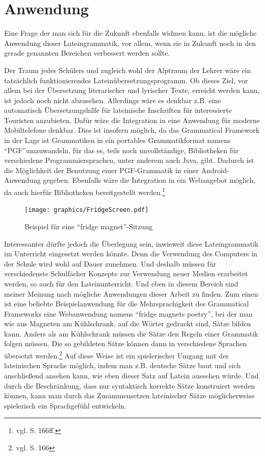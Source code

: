 \section{Anwendung}
Eine Frage der man sich für die Zukunft ebenfalls widmen kann, ist die mögliche Anwendung dieser Lateingrammatik, vor allem, wenn sie in Zukunft noch in den gerade genannten Bereichen verbessert werden sollte. \par
Der Traum jedes Schülers und zugleich wohl der Alptraum der Lehrer wäre ein tatsächlich funktionierendes Lateinübersetzungsprogramm. Ob dieses Ziel, vor allem bei der Übersetzung literarischer und lyrischer Texte, erreicht werden kann, ist jedoch noch nicht abzusehen. Allerdings wäre es denkbar z.B. eine automatisch Übersetzungshilfe für lateinische Inschriften für interessierte Touristen anzubieten. Dafür wäre die Integration in eine Anwendung für moderne Mobiltelefone denkbar. Dies ist insofern möglich, da das Grammatical Framework in der Lage ist Grammatiken in ein portables Grammatikformat namens "`PGF"'umzuwandeln, für das es, teils noch unvollständige, Bibliotheken für verschiedene Programmiersprachen, unter anderem auch Java, gibt. Dadurch ist die Möglichkeit der Benutzung einer PGF-Grammatik in einer Android-Anwendung gegeben. Ebenfalls wäre die Integration in ein Webangebot möglich, da auch hierfür Bibliotheken bereitgestellt werden.\footnote{vgl. \cite{RANTA2011} S. 166ff.} \par
\begin{figure}[h!tp]
\texttt{[image: graphics/FridgeScreen.pdf]}
\caption{Beispiel für eine "`fridge magnet"'-Sitzung}\label{Fridge}
\end{figure}
Interessanter dürfte jedoch die Überlegung sein, inwieweit diese Lateingrammatik im Unterricht eingesetzt werden könnte. Denn die Verwendung des Computers in der Schule wird wohl auf Dauer zunehmen. Und deshalb müssen für verschiedenste Schulfächer Konzepte zur Verwendung neuer Medien erarbeitet werden, so auch für den Lateinunterricht. Und eben in diesem Bereich sind meiner Meinung nach mögliche Anwendungen dieser Arbeit zu finden. Zum einen ist eine beliebte Beispielanwendung für die Mehrsprachigkeit des Grammatical Frameworks eine Webanwendung namens "`fridge magnets poetry"', bei der man wie aus Magneten am Kühlschrank, auf die Wörter gedruckt sind, Sätze bilden kann. Anders als am Kühlschrank müssen die Sätze den Regeln einer Grammatik folgen müssen. Die so gebildeten Sätze können dann in verschiedene Sprachen übersetzt werden.\footnote{vgl. \cite{RANTA2011} S. 166} Auf diese Weise ist ein spielerischer Umgang mit der lateinischen Sprache möglich, indem man z.B. deutsche Sätze baut und sich anschließend ansehen kann, wie eben dieser Satz auf Latein aussehen würde. Und durch die Beschränkung, dass nur syntaktisch korrekte Sätze konstruiert werden können, kann man durch das Zusammensetzen lateinischer Sätze möglicherweise spielerisch ein Sprachgefühl entwickeln. \par
